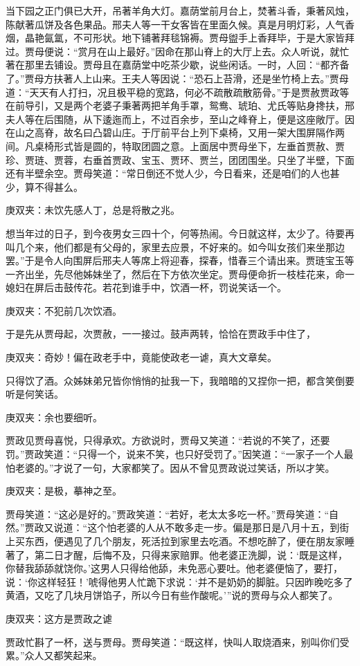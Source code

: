 \begin{parag}
    当下园之正门俱已大开，吊著羊角大灯。嘉荫堂前月台上，焚著斗香，秉著风烛，陈献著瓜饼及各色果品。邢夫人等一干女客皆在里面久候。真是月明灯彩，人气香烟，晶艳氤氲，不可形状。地下铺著拜毯锦褥。贾母盥手上香拜毕，于是大家皆拜过。贾母便说：“赏月在山上最好。”因命在那山脊上的大厅上去。众人听说，就忙著在那里去铺设。贾母且在嘉荫堂中吃茶少歇，说些闲话。一时，人回：“都齐备了。”贾母方扶著人上山来。王夫人等因说：“恐石上苔滑，还是坐竹椅上去。”贾母道：“天天有人打扫，况且极平稳的宽路，何必不疏散疏散筋骨。”于是贾赦贾政等在前导引，又是两个老婆子秉著两把羊角手罩，鸳鸯、琥珀、尤氏等贴身搀扶，邢夫人等在后围随，从下逶迤而上，不过百余步，至山之峰脊上，便是这座敞厅。因在山之高脊，故名曰凸碧山庄。于厅前平台上列下桌椅，又用一架大围屏隔作两间。凡桌椅形式皆是圆的，特取团圆之意。上面居中贾母坐下，左垂首贾赦、贾珍、贾琏、贾蓉，右垂首贾政、宝玉、贾环、贾兰，团团围坐。只坐了半壁，下面还有半壁余空。贾母笑道：“常日倒还不觉人少，今日看来，还是咱们的人也甚少，算不得甚么。\begin{note}庚双夹：未饮先感人丁，总是将散之兆。\end{note}想当年过的日子，到今夜男女三四十个，何等热闹。今日就这样，太少了。待要再叫几个来，他们都是有父母的，家里去应景，不好来的。如今叫女孩们来坐那边罢。”于是令人向围屏后邢夫人等席上将迎春，探春，惜春三个请出来。贾琏宝玉等一齐出坐，先尽他姊妹坐了，然后在下方依次坐定。贾母便命折一枝桂花来，命一媳妇在屏后击鼓传花。若花到谁手中，饮酒一杯，罚说笑话一个。\begin{note}庚双夹：不犯前几次饮酒。\end{note}于是先从贾母起，次贾赦，一一接过。鼓声两转，恰恰在贾政手中住了，\begin{note}庚双夹：奇妙！偏在政老手中，竟能使政老一谑，真大文章矣。\end{note}只得饮了酒。众姊妹弟兄皆你悄悄的扯我一下，我暗暗的又捏你一把，都含笑倒要听是何笑话。\begin{note}庚双夹：余也要细听。\end{note}贾政见贾母喜悦，只得承欢。方欲说时，贾母又笑道：“若说的不笑了，还要罚。”贾政笑道：“只得一个，说来不笑，也只好受罚了。”因笑道：“一家子一个人最怕老婆的。”才说了一句，大家都笑了。因从不曾见贾政说过笑话，所以才笑。\begin{note}庚双夹：是极，摹神之至。\end{note}贾母笑道：“这必是好的。”贾政笑道：“若好，老太太多吃一杯。”贾母笑道：“自然。”贾政又说道：“这个怕老婆的人从不敢多走一步。偏是那日是八月十五，到街上买东西，便遇见了几个朋友，死活拉到家里去吃酒。不想吃醉了，便在朋友家睡著了，第二日才醒，后悔不及，只得来家赔罪。他老婆正洗脚，说：‘既是这样，你替我舔舔就饶你。’这男人只得给他舔，未免恶心要吐。他老婆便恼了，要打，说：‘你这样轻狂！’唬得他男人忙跪下求说：‘并不是奶奶的脚脏。只因昨晚吃多了黄酒，又吃了几块月饼馅子，所以今日有些作酸呢。’”说的贾母与众人都笑了。\begin{note}庚双夹：这方是贾政之谑\end{note}贾政忙斟了一杯，送与贾母。贾母笑道：“既这样，快叫人取烧酒来，别叫你们受累。”众人又都笑起来。
\end{parag}



